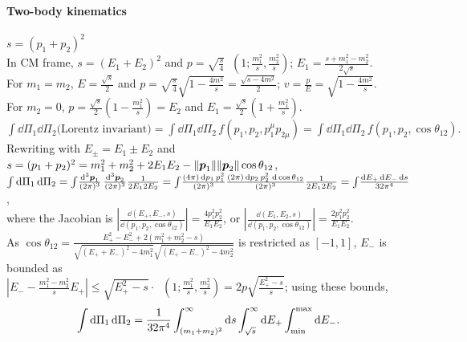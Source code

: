 \documentclass[new]{subfiles}
\begin{document}
\paragraph{Two-body kinematics}
$s=(p_1+p_2)^2$\\
In CM frame, $s=(E_1+E_2)^2$ and
$p= \sqrt{\frac{s}{4}}\mathop{\lambda^{1/2}}\left(1;\frac{m_1^2}{s},\frac{m_2^2}{s}\right)$;
\quad
$E_1 = \frac{s+m_1^2-m_2^2}{2\sqrt{s}}$.
\\
For $m_1=m_2$, $E=\frac{\sqrt{s}}{2}$ and $
p = \sqrt{\frac{s}{4}}\sqrt{1-\frac{4 m^2}{s}}
=\frac{\sqrt{s-4m^2}}{2}$; $v=\frac{p}{E}=\sqrt{1-\frac{4m^2}{s}}$.
\\
For $m_2=0$, $p=\frac{\sqrt{s}}{2}\left(1-\frac{m_1^2}{s}\right)=E_2$ and
$E_1=\frac{\sqrt{s}}{2}\left(1+\frac{m_1^2}{s}\right)$.
$
\int\!\dd\Pi_1\dd\Pi_2\text{(Lorentz invariant)}
= \int\!\dd\Pi_1\dd\Pi_2\,f(p_1, p_2, p_1^\mu p_{2\mu})
= \int\!\dd\Pi_1\dd\Pi_2\,f(p_1,p_2,\cos\theta_{12}).
$
\\
Rewriting with $E_\pm = E_1\pm E_2$ and $s=(p_1+p_2)^2=m_1^2 + m_2^2 + 2E_1E_2 - \|{\boldsymbol{p}}_1\|\|{\boldsymbol{p}}_2\|\cos\theta_{12}$,
\\
$
\int\dd\Pi_1\dd\Pi_2
=
\int\ddP{p_1}\,\,\ddP{p_2}\frac{1}{2E_12E_2}
=
\int\!\frac{(4\pi)\dd p_1\,p_1^2}{(2\pi)^3}
\frac{(2\pi)\dd p_2\,p_2^2\,\dd\cos\theta_{12}}{(2\pi)^3}\frac{1}{2E_12E_2}
=
\int\!\frac{\dd E_+\dd E_- \dd s}{32\pi^4}
$,
\\
where the Jacobian is $\left|\frac{\dd(E_+,E_-,s)}{\dd(p_1, p_2, \cos\theta_{12})}\right|=\frac{4p_1^2p_2^2}{E_1E_2}$, or $\left|\frac{\dd(E_1,E_2,s)}{\dd(p_1, p_2, \cos\theta_{12})}\right|=\frac{2p_1^2p_2^2}{E_1E_2}.$
\\
As $
\cos\theta_{12}=\frac{E_+^2-E_-^2+2 \left(m_1^2+m_2^2-s\right)}{\sqrt{(E_++E_-)^2-4 m_1^2}\sqrt{(E_+-E_-)^2-4 m_2^2}}
$ is restricted as $[-1,1]$, $E_-$ is bounded as
\\
$
\left|E_- - \frac{m_1^2-m_2^2}{s}E_+\right| 
\le
\sqrt{E_+^2-s}\cdot\mathop{\lambda^{1/2}}\left(1;\frac{m_1^2}{s},\frac{m_2^2}{s}\right)
=
2p\sqrt{\frac{E_+^2-s}{s}}
$; using these bounds,
\begin{equation}
 \int\mathop{}\!\mathrm{d}\Pi_1\mathop{}\!\mathrm{d}\Pi_2
=
\frac{1}{32\pi^4}
\int_{(m_1+m_2)^2}^\infty\mathop{}\!\mathrm{d} s
\int_{\sqrt{s}}^\infty\mathop{}\!\mathrm{d} E_+
\int_{\mathrm{min}}^{\mathrm{max}}\mathop{}\!\mathrm{d} E_-.
\end{equation}
\end{document}
